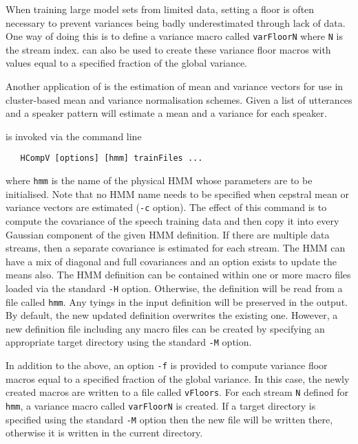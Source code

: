When training large model sets from limited data, setting a floor
is often necessary to prevent variances being badly underestimated
through lack of data.  One way of doing this is to define
a variance macro called \texttt{varFloorN}
where \texttt{N} is the stream index.  can also be
used to create these variance floor macros with values equal to
a specified fraction of the global variance.

Another application of  is the estimation of mean and variance
vectors for use in cluster-based mean and variance normalisation
schemes. Given a list of utterances and a speaker pattern
 will estimate a mean and a variance for each speaker.


 is invoked via the command line
\begin{verbatim}
   HCompV [options] [hmm] trainFiles ...
\end{verbatim}
where \texttt{hmm} is the name of the physical HMM whose parameters
are to be initialised. Note that no HMM name needs to be specified
when cepstral mean or variance vectors are estimated (\texttt{-c}
option). The effect of this command is to compute the covariance of
the speech training data and then copy it into every Gaussian
component of the given HMM definition.  If there are multiple data
streams, then a separate covariance is estimated for each stream.  The
HMM can have a mix of diagonal and full covariances and an option
exists to update the means also.  The HMM definition can be contained
within one or more macro files loaded via the standard \texttt{-H}
option.  Otherwise, the definition will be read from a file called
\texttt{hmm}.  Any tyings in the input definition will be preserved in
the output. By default, the new updated definition overwrites the
existing one.  However, a new definition file including any macro
files can be created by specifying an appropriate target directory
using the standard \texttt{-M} option.

In addition to the above, an option \texttt{-f} is provided to compute
variance floor macros equal to a specified fraction
of the global variance.  In this case, the newly created macros are
written to a file called \texttt{vFloors}.  
For each stream \texttt{N} defined for \texttt{hmm},  a variance macro 
called \texttt{varFloorN} is created.
If a target directory is specified
using the standard \texttt{-M} option then the new file will be written
there, otherwise it is written in the current directory.

